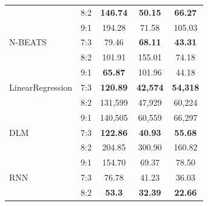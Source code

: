 \documentclass[conference]{IEEEtran}
\begin{document}
\begin{table}[H]
\begin{tabular}{|l|l|c|c|c|}
                               & 8:2                         & \textbf{146.74}           & \textbf{50.15}                 & \textbf{66.27}           \\ \cline{2-5}
                               & 9:1                         & 194.28                    & 71.58                          & 105.03                   \\ \hline
        N-BEATS                & 7:3                         & 79.46                     & \textbf{68.11}                 & \textbf{43.31}           \\ \cline{2-5}
                               & 8:2                         & 101.91                    & 155.01                         & 74.18                    \\ \cline{2-5}
                               & 9:1                         & \textbf{65.87}            & 101.96                         & 44.18                    \\ \hline
        LinearRegression       & 7:3                         & \textbf{120.89}           & \textbf{42,574}                & \textbf{54,318}          \\ \cline{2-5}
                               & 8:2                         & 131,599                   & 47,929                         & 60,224                   \\ \cline{2-5}
                               & 9:1                         & 140,505                   & 60,559                         & 66,297                   \\ \hline
        DLM                    & 7:3                         & \textbf{122.86}           & \textbf{40.93}                 & \textbf{55.68}           \\ \cline{2-5}
                               & 8:2                         & 204.85                    & 300.90                         & 160.82                   \\ \cline{2-5}
                               & 9:1                         & 154.70                    & 69.37                          & 78.50                    \\ \hline
        RNN                    & 7:3                         & 76.78                     & 41.23                          & 36.03                    \\ \cline{2-5}
                               & 8:2                         & \textbf{53.3}             & \textbf{32.39}                 & \textbf{22.66}           \\ \cline{2-5}

\end{tabular}
\end{table}
\end{document}
